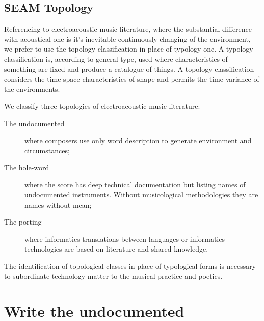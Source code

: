\documentclass[twoside,a4paper]{article}
\begin{document}
\subsection{SEAM Topology}

Referencing to electroacoustic music literature, where the substantial difference with acoustical one is it's inevitable continuously changing of the environment, we prefer to use the topology classification in place of typology one. A typology classification is, according to general type, used where characteristics of something are fixed and produce a catalogue of things. A topology classification considers the time-space characteristics of shape and permits the time variance of the environments.

We classify three topologies of electroacoustic music literature:

\begin{description}
  \item[The undocumented] where composers use only word description to generate environment and circumstances;
  \item[The hole-word] where the score has deep technical documentation but listing names of undocumented instruments. Without musicological methodologies they are names without mean;
  \item[The porting] where informatics translations between languages or informatics technologies are based on literature and shared knowledge.
\end{description}

The identification of topological classes in place of typological forms is necessary to subordinate technology-matter to the musical practice and poetics. %


\section{Write the undocumented}
\label{sec:writing}
\end{document}
